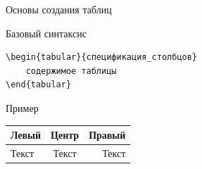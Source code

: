 \documentclass[aspectratio=169]{beamer}
\begin{document}
\begin{frame}[fragile]{Основы создания таблиц}
    \begin{block}{Базовый синтаксис}
        \begin{verbatim}
\begin{tabular}{спецификация_столбцов}
    содержимое таблицы
\end{tabular}
        \end{verbatim}
    \end{block}
    
    \vspace{0.5cm}
    
    \begin{exampleblock}{Пример}
        \begin{center}
        \begin{tabular}{|l|c|r|}
        \hline
        Левый & Центр & Правый \\
        \hline
        Текст & Текст & Текст \\
        \hline
        \end{tabular}
        \end{center}
    \end{exampleblock}
\end{frame}
\end{document}
